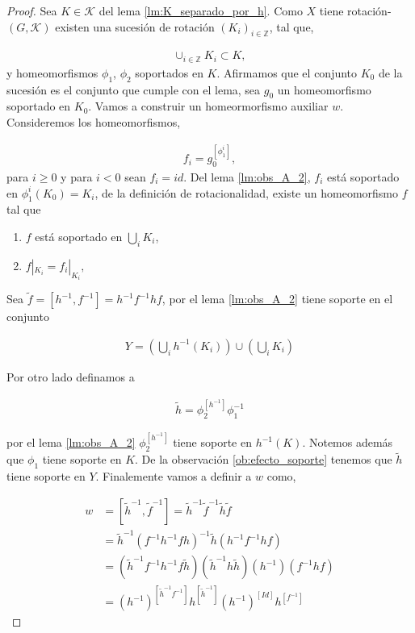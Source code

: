 \documentclass{subfiles}
\begin{document}
\begin{proof}
Sea $K \in \mathcal{K}$ del lema \ref{lm:K_separado_por_h}. Como $X$ tiene rotación- $(G, \mathcal{K})$ existen una sucesión de rotación $(K_i)_{i \in \mathbb{Z}}$, tal que,

\begin{align*}
\cup_{i \in \mathbb{Z}} K_i \subset K,
\end{align*}
y homeomorfismos $\phi_1$, $\phi_2$ soportados en $K$. Afirmamos que el conjunto $K_0$ de la sucesión es el conjunto que cumple con el lema, sea $g_0$ un homeomorfismo soportado en $K_0$. Vamos a construir un homeormorfismo auxiliar $w$. Consideremos los homeomorfismos, 

\begin{align*}
f_i=g_0^{[\phi_1^i]},
\end{align*}
para $i \geq 0$ y para $i<0$ sean $f_i=id$. Del lema \ref{lm:obs_A_2}, $f_i$ está soportado en $\phi_1^i(K_0)=K_i$, de la definición de rotacionalidad, existe un homeomorfismo $f$ tal que

\begin{enumerate}
	\item $f$ está soportado en $\bigcup_i K_i$,
	\item $f |_{K_i}=f_i|_{K_i},$
\end{enumerate}

Sea $\tilde{f}=[h^{-1},f^{-1}]=h^{-1}f^{-1}hf$,  por el lema \ref{lm:obs_A_2} tiene soporte en el conjunto

\begin{align*}
 Y= \left(\bigcup_i h^{-1}(K_i) \right)\cup \left(\bigcup_i K_i \right)
\end{align*}

Por otro lado definamos a 

\begin{align*}
\tilde{h}=\phi_2^{[h^{-1}]}\phi_1^{-1}
\end{align*}

por el lema \ref{lm:obs_A_2} $\phi_2^{[h^{-1}]}$ tiene soporte en $h^{-1}(K)$. Notemos además que $\phi_1$ tiene soporte en $K$. De la observación \ref{ob:efecto_soporte} tenemos que $\tilde{h}$ tiene soporte en $Y.$ Finalemente vamos a definir a $w$ como,

\begin{align*}
w & = [\tilde{h}^{-1},\tilde{f}^{-1}]=\tilde{h}^{-1}\tilde{f}^{-1}\tilde{h}\tilde{f} \\
& = \tilde{h}^{-1} (f^{-1}h^{-1}fh)^{-1}\tilde{h}(h^{-1}f^{-1}hf)\\
& = (\tilde{h}^{-1} f^{-1}h^{-1}f \tilde{h})(\tilde{h}^{-1} h\tilde{h})(h^{-1})(f^{-1}hf)\\
& = (h^{-1})^{[\tilde{h}^{-1} f^{-1}]}h^{[\tilde{h}^{-1} ]}(h^{-1})^{[Id]}h^{[f^{-1}]}
\end{align*}



\end{proof}
\end{document}
